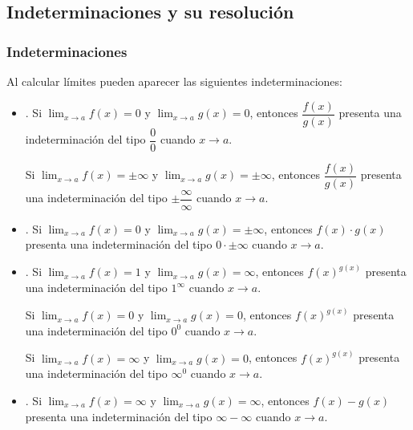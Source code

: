 	\subsection{Indeterminaciones y su resolución}
	\begin{frame}
		\frametitle{Indeterminaciones}
		Al calcular límites pueden aparecer las siguientes indeterminaciones:
		\begin{itemize}
			\item {}. Si $\lim_{x\rightarrow a} f(x)=0$ y $\lim_{x\rightarrow a} g(x)=0$, entonces
			      $\dfrac{f(x)}{g(x)}$ presenta una indeterminación del tipo \alert{$\dfrac{0}{0}$} cuando $x\rightarrow a$.
			      
			      Si $\lim_{x\rightarrow a} f(x)=\pm\infty$ y $\lim_{x\rightarrow a} g(x)=\pm\infty$, entonces $\dfrac{f(x)}{g(x)}$ presenta una indeterminación del tipo \alert{$\pm\dfrac{\infty}{\infty}$} cuando $x\rightarrow a$.
			      
			\item {}. Si $\lim_{x\rightarrow a} f(x)=0$ y $\lim_{x\rightarrow a} g(x)=\pm\infty$,
			      entonces $f(x)\cdot g(x)$ presenta una indeterminación del tipo \alert{$0\cdot \pm\infty$} cuando $x\rightarrow a$.
			      
			\item {}. Si $\lim_{x\rightarrow a} f(x)=1$ y $\lim_{x\rightarrow a} g(x)=\infty$,
			      entonces $f(x)^{g(x)}$ presenta una indeterminación del tipo \alert{$1^\infty$} cuando $x\rightarrow a$.
			      
			      Si $\lim_{x\rightarrow a} f(x)=0$ y $\lim_{x\rightarrow a} g(x)=0$, entonces $f(x)^{g(x)}$ presenta una indeterminación del tipo \alert{$0^0$} cuando $x\rightarrow a$.
			      
			      Si $\lim_{x\rightarrow a} f(x)=\infty$ y $\lim_{x\rightarrow a} g(x)=0$, entonces $f(x)^{g(x)}$ presenta una indeterminación del tipo \alert{$\infty^0$} cuando $x\rightarrow a$.
			      
			\item {}. Si $\lim_{x\rightarrow a} f(x)=\infty$ y $\lim_{x\rightarrow a}
			      g(x)=\infty$, entonces $f(x)-g(x)$ presenta una indeterminación del tipo \alert{$\infty-\infty$} cuando $x\rightarrow a$.
		\end{itemize}
	\end{frame}
	

